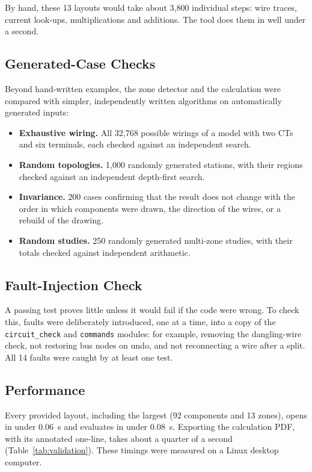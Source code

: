 By hand, these 13 layouts would take about 3{,}800 individual steps: wire traces,
current look-ups, multiplications and additions. The tool does them in well under a
second.

\subsection{Generated-Case Checks}\label{sec:generated}

Beyond hand-written examples, the zone detector and the calculation were compared with
simpler, independently written algorithms on automatically generated inputs:

\begin{itemize}
  \item \textbf{Exhaustive wiring.} All 32{,}768 possible wirings of a model with two
        CTs and six terminals, each checked against an independent search.
  \item \textbf{Random topologies.} 1{,}000 randomly generated stations, with their
        regions checked against an independent depth-first search.
  \item \textbf{Invariance.} 200 cases confirming that the result does not change with
        the order in which components were drawn, the direction of the wires, or a
        rebuild of the drawing.
  \item \textbf{Random studies.} 250 randomly generated multi-zone studies, with their
        totals checked against independent arithmetic.
\end{itemize}

\subsection{Fault-Injection Check}

A passing test proves little unless it would fail if the code were wrong. To check
this, faults were deliberately introduced, one at a time, into a copy of the
\texttt{circuit\_check} and \texttt{commands} modules: for example, removing the
dangling-wire check, not restoring bus nodes on undo, and not reconnecting a wire
after a split. All 14 faults were caught by at least one test.

\subsection{Performance}

Every provided layout, including the largest (92 components and 13 zones), opens in
under \SI{0.06}{s} and evaluates in under \SI{0.08}{s}. Exporting the calculation PDF,
with its annotated one-line, takes about a quarter of a second
(Table~\ref{tab:validation}). These timings were measured on a Linux desktop computer.

